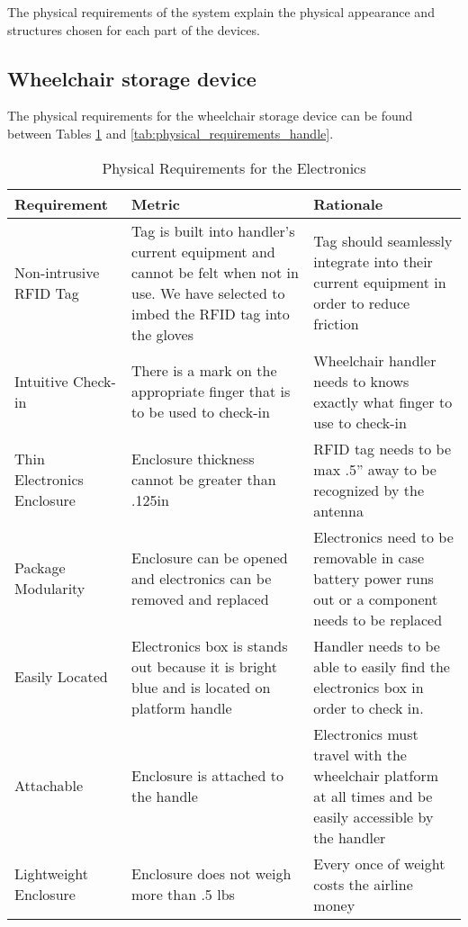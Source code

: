 The physical requirements of the system explain the physical appearance and structures chosen for each part of the devices. 

\subsection*{Wheelchair storage device}

The physical requirements for the wheelchair storage device can be found between Tables \ref{tab:physical_requirements_electronics} and \ref{tab:physical_requirements_handle}.

\clearpage
\newpage

\begin{table}
\begin{tabular} {| p{4cm} | p{5cm} | p{5cm} |}
\hline
\textbf{Requirement} & \textbf{Metric} & \textbf{Rationale} \\ \hline

Non-intrusive RFID Tag & Tag is built into handler's current equipment and cannot be felt when not in use. We have selected to imbed the RFID tag into the gloves &
Tag should seamlessly integrate into their current equipment in order to reduce friction \\ \hline
Intuitive Check-in & There is a mark on the appropriate finger that is to be used to check-in & Wheelchair handler needs to knows exactly what finger to use to check-in \\ \hline
Thin Electronics Enclosure & Enclosure thickness cannot be greater than .125in & RFID tag needs to be max .5” away to be recognized by the antenna \\ \hline
Package Modularity & Enclosure can be opened and electronics can be removed and replaced & 
Electronics need to be removable in case battery power runs out or a component needs to be replaced  \\ \hline
Easily Located & Electronics box is stands out because it is bright blue and is located on platform handle &
Handler needs to be able to easily find the electronics box in order to check in. \\ \hline
Attachable & Enclosure is attached to the handle & Electronics must travel with the wheelchair platform at all times and be easily accessible by the handler \\ \hline
Lightweight Enclosure & Enclosure does not weigh more than .5 lbs & Every once of weight costs the airline money
 \\ \hline
\end{tabular} 
\caption{Physical Requirements for the Electronics}
\label{tab:physical_requirements_electronics}
\end{table}

